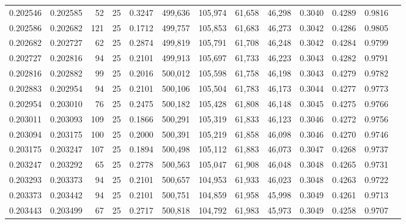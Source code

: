 \begin{tabular}{rrrrrrrrrrrrr}
0.202546 & 0.202585 &    52 &  25 &                                     0.3247 & 499,636 & 105,974 &  61,658 &  46,298 & 0.3040 & 0.4289 & 0.9816 \\
0.202586 & 0.202682 &   121 &  25 &                                     0.1712 & 499,757 & 105,853 &  61,683 &  46,273 & 0.3042 & 0.4286 & 0.9805 \\
0.202682 & 0.202727 &    62 &  25 &                                     0.2874 & 499,819 & 105,791 &  61,708 &  46,248 & 0.3042 & 0.4284 & 0.9799 \\
0.202727 & 0.202816 &    94 &  25 &                                     0.2101 & 499,913 & 105,697 &  61,733 &  46,223 & 0.3043 & 0.4282 & 0.9791 \\
0.202816 & 0.202882 &    99 &  25 &                                     0.2016 & 500,012 & 105,598 &  61,758 &  46,198 & 0.3043 & 0.4279 & 0.9782 \\
0.202883 & 0.202954 &    94 &  25 &                                     0.2101 & 500,106 & 105,504 &  61,783 &  46,173 & 0.3044 & 0.4277 & 0.9773 \\
0.202954 & 0.203010 &    76 &  25 &                                     0.2475 & 500,182 & 105,428 &  61,808 &  46,148 & 0.3045 & 0.4275 & 0.9766 \\
0.203011 & 0.203093 &   109 &  25 &                                     0.1866 & 500,291 & 105,319 &  61,833 &  46,123 & 0.3046 & 0.4272 & 0.9756 \\
0.203094 & 0.203175 &   100 &  25 &                                     0.2000 & 500,391 & 105,219 &  61,858 &  46,098 & 0.3046 & 0.4270 & 0.9746 \\
0.203175 & 0.203247 &   107 &  25 &                                     0.1894 & 500,498 & 105,112 &  61,883 &  46,073 & 0.3047 & 0.4268 & 0.9737 \\
0.203247 & 0.203292 &    65 &  25 &                                     0.2778 & 500,563 & 105,047 &  61,908 &  46,048 & 0.3048 & 0.4265 & 0.9731 \\
0.203293 & 0.203373 &    94 &  25 &                                     0.2101 & 500,657 & 104,953 &  61,933 &  46,023 & 0.3048 & 0.4263 & 0.9722 \\
0.203373 & 0.203442 &    94 &  25 &                                     0.2101 & 500,751 & 104,859 &  61,958 &  45,998 & 0.3049 & 0.4261 & 0.9713 \\
0.203443 & 0.203499 &    67 &  25 &                                     0.2717 & 500,818 & 104,792 &  61,983 &  45,973 & 0.3049 & 0.4258 & 0.9707 \\

\end{tabular}
